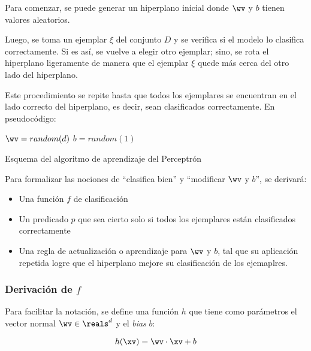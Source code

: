 Para comenzar, se puede generar un hiperplano inicial donde $\wv$ y $b$ tienen valores aleatorios. 

Luego, se toma un ejemplar $\xi$ del conjunto $D$ y se verifica si el modelo lo clasifica correctamente. Si es así, se vuelve a elegir otro ejemplar; sino, se rota el hiperplano ligeramente de manera que el ejemplar $\xi$ quede más cerca del otro lado del hiperplano. 

Este procedimiento se repite hasta que todos los ejemplares se encuentran en el lado correcto del hiperplano, es decir, sean clasificados correctamente. En pseudocódigo:

\begin{algorithm}[H]
$\wv=random(d)$\;
$b=random(1)$\;
\caption{Esquema del algoritmo de aprendizaje del Perceptrón} 
\end{algorithm}
\vspace{10pt}

Para formalizar las nociones de ``clasifica bien'' y ``modificar $\wv$ y $b$'', se derivará:

\begin{itemize}
\item Una función $f$ de clasificación
\item Un predicado $p$ que sea cierto solo si todos los ejemplares están clasificados correctamente
\item Una regla de actualización o aprendizaje para $\wv$ y $b$, tal que su aplicación repetida logre que el hiperplano mejore su clasificación de los ejemaplres.
\end{itemize} 

\subsubsection{Derivación de $f$}

Para facilitar la notación, se define una función $h$ que tiene como parámetros el vector normal $\wv \in \reals^{d}$ y el \textit{bias} $b$:

\begin{equation}
 h(\xv)= \wv \cdot \xv + b 
 \end{equation}

